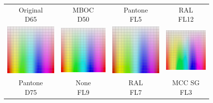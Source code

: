\begin{figure}[ht]
	\centering
	{\sffamily
		\setlength\tabcolsep{1.5pt}
		\begin{tabular}{cccc}
			\makecell{Original\\D65} & \makecell{MBOC\\D50} & \makecell{Pantone\\FL5} &\makecell{RAL\\FL12}
			\vspace{0.5em}\\ 
			\includegraphics[width=.22\linewidth]{img/gradient_complete.jpg}
			&
			\includegraphics[width=.22\linewidth]{img/gradient_complete_mbcD50.jpg}
			& 
			\includegraphics[width=.22\linewidth]{img/gradient_complete_pantoneFL5.jpg}
			& 
			\includegraphics[width=.22\linewidth]{img/gradient_complete_ralFL12.jpg} \vspace{0.5em}\\
			\makecell{Pantone\\D75}& \makecell{None\\FL9} & \makecell{RAL\\FL7}  & \makecell{MCC SG\\FL3}
			\vspace{0.3em}\\

\end{tabular}}
\end{figure}
